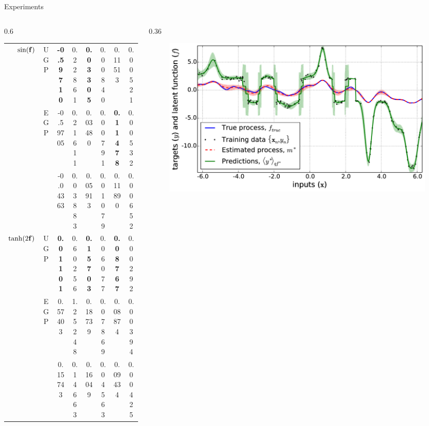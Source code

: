 \documentclass[final]{beamer}
\newlength{\onecolwid}
\newlength{\twocolwid}
\begin{document}
\begin{frame}[t]
\begin{columns}[t]
\begin{column}{\twocolwid}
\begin{columns}[t,totalwidth=\twocolwid]
\begin{column}{\twocolwid}
\begin{block}{Experiments}
\begin{columns}
\begin{column}{0.6\twocolwid}
\begin{table}[tb]
\begin{tabular}{r|c| c c c c c c}
        $\sin\!\left({\mathbf{f}}\right)$ 
& UGP & \textbf{-0.59710} & 0.22861 & \textbf{0.03305} & 0.00840 & 0.11513 & 0.00521 \\
& EGP & -0.59705 & 0.21611 & 0.03480 & 0.00791 & \textbf{0.11478} & 0.00532 \\
& \cite{Opper2009} & -0.04363 & 0.03883 & 0.05913 & 0.01079 & 0.11890 & 0.00652 \\
        \midrule
        $\tanh\!\left({2\mathbf{f}}\right)$
& UGP & \textbf{0.01101} & 0.60256 & \textbf{0.15703} & 0.06077 & \textbf{0.08767} & 0.00292 \\
& EGP & 0.57403 & 1.25248 & 0.18739 & 0.07869 & 0.08874 & 0.00394 \\
& \cite{Opper2009} & 0.15743 & 0.14663 & 0.16049 & 0.04563 & 0.09434 & 0.00425 \\
        \bottomrule
    \end{tabular}
    \label{tab:toy}
\end{table}




\end{column}

\begin{column}{0.36\twocolwid}
\vspace{-3mm}
\begin{figure}
    \includegraphics[width=0.6\onecolwid]{fig/signdemo.png}


\end{figure}
\end{column}
\end{columns}
\end{block}
\end{column}
\end{columns}
\end{column}
\end{columns}
\end{frame}
\end{document}
